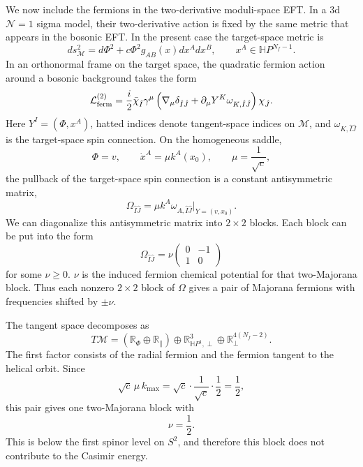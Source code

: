 \documentclass[a4paper,11pt]{article}
\begin{document}
We now include the fermions in the two-derivative moduli-space EFT. In a 3d $\mathcal N=1$ sigma model, their
two-derivative action is fixed by the same metric that appears in the bosonic EFT. In the present case the target-space metric is
\begin{equation}
  ds^2_{\mathcal M} = d\Phi^2 + c\Phi^2 g_{AB}(x)dx^A dx^B, \qquad x^A\in \mathbb HP^{N_f-1}.
\end{equation}
In an orthonormal frame on the target space, the quadratic fermion action around a bosonic background takes the form
\begin{equation}
  \mathcal L_{\rm ferm}^{(2)}
  =
  \frac{i}{2}
  \bar\chi_{\hat I}\gamma^\mu
  \left(
    \nabla_\mu\delta_{\hat I\hat J}
    +
    \partial_\mu Y^K\omega_{K,\hat I\hat J}
  \right)
  \chi_{\hat J}.
\end{equation}
Here $Y^I=(\Phi,x^A)$, hatted indices denote tangent-space indices on $\mathcal M$, and $\omega_{K,\hat I\hat J}$ is the target-space spin connection. On the homogeneous saddle,
\begin{equation}
  \Phi=v, \qquad \dot x^A=\mu k^A(x_0), \qquad \mu=\frac1{\sqrt c},
\end{equation}
the pullback of the target-space spin connection is a constant antisymmetric matrix,
\begin{equation}
  \Omega_{\hat I\hat J} = \mu k^A\omega_{A,\hat I\hat J}\big|_{Y=(v,x_0)} .
\end{equation}
We can diagonalize this antisymmetric matrix into $2\times2$ blocks. Each block can be put into the form
\begin{equation}
  \Omega_{\hat I\hat J}
  =
  \nu
  \begin{pmatrix}
    0 & -1\\
    1 & 0
  \end{pmatrix}
\end{equation}
for some $\nu\geq0$. $\nu$ is the induced fermion chemical potential for that two-Majorana block. Thus each nonzero $2\times2$ block of $\Omega$ gives a pair of Majorana fermions with frequencies shifted by $\pm\nu$.

The tangent space decomposes as
\begin{equation}
  T\mathcal M
  =
  \left(\mathbb R_\Phi\oplus\mathbb R_{\parallel}\right)
  \oplus
  \mathbb R^3_{\mathbb HP^1,\perp}
  \oplus
  \mathbb R^{4(N_f-2)}_{\perp}.
\end{equation}
The first factor consists of the radial fermion and the fermion tangent to the helical orbit. Since
\begin{equation}
  \sqrt c\,\mu\, k_{\max} = \sqrt c\cdot\frac1{\sqrt c}\cdot\frac12 = \frac12,
\end{equation}
this pair gives one two-Majorana block with
\begin{equation}
  \nu=\frac12.
\end{equation}
This is below the first spinor level on $S^2$, and therefore this block does not contribute to the Casimir energy.
\end{document}

